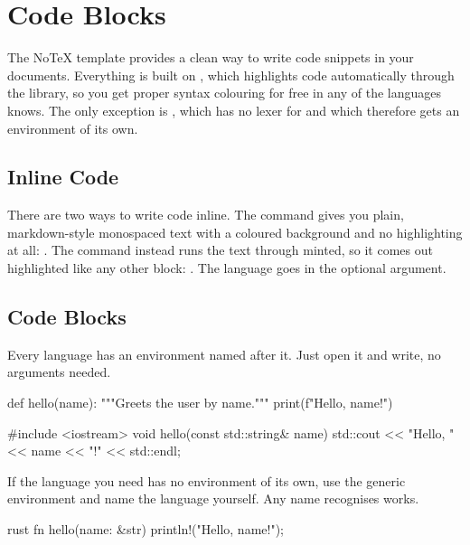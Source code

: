 \documentclass[../main.tex]{subfiles}
\begin{document}
\section{Code Blocks}

The NoTeX template provides a clean way to write code snippets in your documents. Everything is built on , which highlights code automatically through the  library, so you get proper syntax colouring for free in any of the languages  knows. The only exception is , which  has no lexer for and which therefore gets an environment of its own.

\subsection{Inline Code}

There are two ways to write code inline. The  command gives you plain, markdown-style monospaced text with a coloured background and no highlighting at all: . The  command instead runs the text through minted, so it comes out highlighted like any other block: . The language goes in the optional argument.

\subsection{Code Blocks}

Every language has an environment named after it. Just open it and write, no arguments needed.

\begin{python}
def hello(name):
    """Greets the user by name."""
    print(f"Hello, {name}!")
\end{python}

\begin{cpp}
#include <iostream>
void hello(const std::string& name) {
    std::cout << "Hello, " << name << "!" << std::endl;
}
\end{cpp}

If the language you need has no environment of its own, use the generic  environment and name the language yourself. Any name  recognises works.

\begin{code}{rust}
fn hello(name: &str) {
    println!("Hello, {name}!");
}
\end{code}
\end{document}
